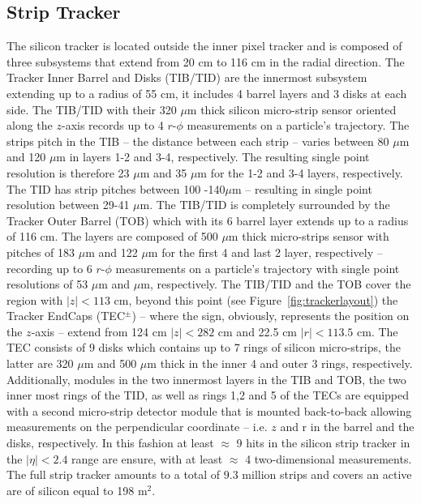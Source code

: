 \subsection{Strip Tracker}
The silicon tracker is located outside the inner pixel tracker and is
composed of three subsystems that extend from 20 cm to 116 cm in the
radial direction. The Tracker Inner Barrel and Disks (TIB/TID) are
the innermost subsystem extending up to a radius of 55 cm, it includes
4 barrel layers and 3 disks at each side. The TIB/TID with their 320
$\mu$m thick silicon micro-strip sensor oriented along the $z$-axis records up to 4 $r$-$\phi$
measurements on a particle's trajectory. The strips pitch  in the TIB -- the
distance between each strip -- varies between 80 $\mu$m and 120 $\mu$m
in layers 1-2 and 3-4, respectively. The resulting single point
resolution is therefore 23 $\mu$m and 35 $\mu$m for the 1-2 and 3-4
layers, respectively. The TID has strip pitches between 100 -140$\mu$m
-- resulting in single point resolution between 29-41 $\mu$m. The
TIB/TID is completely surrounded by the Tracker Outer Barrel (TOB)
which with its 6 barrel layer extends up to a radius of 116 cm. The
layers are composed of 500 $\mu$m thick micro-strips sensor with
pitches of 183 $\mu$m and 122 $\mu$m for the first 4  and last 2
layer, respectively -- recording up to 6 $r$-$\phi$
measurements on a particle's trajectory with single point resolutions of 53 $\mu$m
and $\mu$m, respectively. The TIB/TID and the TOB cover the region
with $|z|< 113$ cm, beyond this point (see
Figure~\ref{fig:trackerlayout}) the Tracker EndCaps (TEC$^{\pm}$) --
where the sign, obviously, represents the position on the $z$-axis --
extend from 124 cm $|z|< 282$ cm and 22.5 cm $|r|< 113.5$ cm. The TEC
consists of 9 disks which contains up to 7 rings of silicon
micro-strips, the latter are 320 $\mu$m and 500 $\mu$m thick in the
inner 4 and outer 3 rings, respectively.
Additionally, modules in the two innermost layers in the TIB and TOB,
the two inner most rings of the TID, as well as rings 1,2 and 5 of the TECs are
equipped with a second micro-strip detector module that is mounted
back-to-back allowing measurements on the perpendicular coordinate --
i.e. $z$ and r in the barrel and the disks, respectively. In this
fashion at least $\approx$ 9 hits in the silicon strip tracker in the
$|\eta|<2.4$ range are ensure, with at least $\approx$ 4
two-dimensional measurements. The full strip tracker amounts to a
total of 9.3 million strips and covers an active are of silicon equal
to 198 m$^2$.

